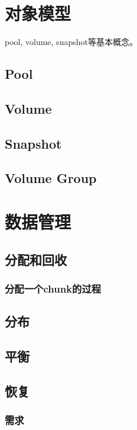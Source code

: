 \chapter{对象模型}

pool, volume, snapshot等基本概念。

\section{Pool}
\section{Volume}
\section{Snapshot}
\section{Volume Group}

\chapter{数据管理}

\section{分配和回收}

\subsection{分配一个chunk的过程}



\section{分布}

\section{平衡}

\section{恢复}

\subsection{需求}

